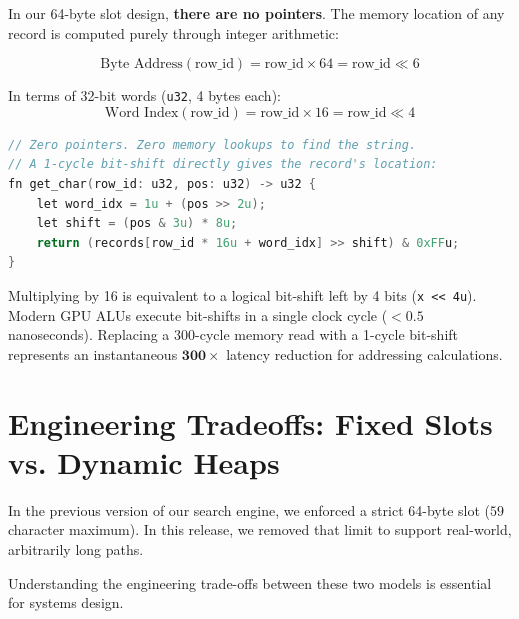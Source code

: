 \documentclass[a4paper,11pt]{article}
\begin{document}
In our 64-byte slot design, \textbf{there are no pointers}. The memory location of any record is computed purely through integer arithmetic:

\begin{equation}
  \text{Byte Address}(\text{row\_id}) = \text{row\_id} \times 64 = \text{row\_id} \ll 6
\end{equation}

In terms of 32-bit words (\texttt{u32}, 4 bytes each):
\begin{equation}
  \text{Word Index}(\text{row\_id}) = \text{row\_id} \times 16 = \text{row\_id} \ll 4
\end{equation}

\begin{lstlisting}[language=C]
// Zero pointers. Zero memory lookups to find the string.
// A 1-cycle bit-shift directly gives the record's location:
fn get_char(row_id: u32, pos: u32) -> u32 {
    let word_idx = 1u + (pos >> 2u);
    let shift = (pos & 3u) * 8u;
    return (records[row_id * 16u + word_idx] >> shift) & 0xFFu;
}
\end{lstlisting}

\begin{conceptbox}
Multiplying by 16 is equivalent to a logical bit-shift left by 4 bits (\texttt{x << 4u}). Modern GPU ALUs execute bit-shifts in a single clock cycle ($< 0.5$ nanoseconds). Replacing a 300-cycle memory read with a 1-cycle bit-shift represents an instantaneous $\mathbf{300\times}$ latency reduction for addressing calculations.
\end{conceptbox}

\newpage

\section{Engineering Tradeoffs: Fixed Slots vs. Dynamic Heaps}

In the previous version of our search engine, we enforced a strict 64-byte slot ($59$ character maximum). In this release, we removed that limit to support real-world, arbitrarily long paths. 

Understanding the engineering trade-offs between these two models is essential for systems design.
\end{document}

